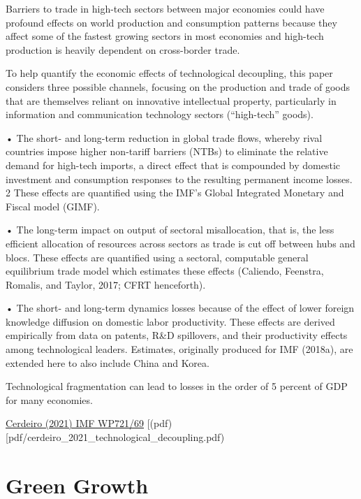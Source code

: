 \documentclass[
]{book}
\begin{document}
Barriers to trade in high-tech sectors
between major economies could have
profound effects on world production
and consumption patterns because they
affect some of the fastest growing
sectors in most economies and high-tech
production is heavily dependent on
cross-border trade.

To help quantify the economic effects of technological decoupling, this paper considers three
possible channels, focusing on the production and trade of goods that are themselves reliant on
innovative intellectual property, particularly in information and communication technology
sectors (``high-tech'' goods).

• The short- and long-term reduction in global trade flows, whereby rival countries impose
higher non-tariff barriers (NTBs) to eliminate the relative demand for high-tech imports,
a direct effect that is compounded by domestic investment and consumption responses to
the resulting permanent income losses. 2 These effects are quantified using the IMF's
Global Integrated Monetary and Fiscal model (GIMF).

• The long-term impact on output of sectoral misallocation, that is, the less efficient
allocation of resources across sectors as trade is cut off between hubs and blocs. These
effects are quantified using a sectoral, computable general equilibrium trade model which
estimates these effects (Caliendo, Feenstra, Romalis, and Taylor, 2017; CFRT
henceforth).

• The short- and long-term dynamics losses because of the effect of lower foreign
knowledge diffusion on domestic labor productivity. These effects are derived empirically
from data on patents, R\&D spillovers, and their productivity effects among technological
leaders. Estimates, originally produced for IMF (2018a), are extended here to also
include China and Korea.

Technological fragmentation can lead to losses in the order of 5 percent of GDP for many economies.

\href{https://www.imf.org/en/Publications/WP/Issues/2021/03/12/Sizing-Up-the-Effects-of-Technological-Decoupling-50125}{Cerdeiro (2021) IMF WP721/69}
{[}(pdf){[}pdf/cerdeiro\_2021\_technological\_decoupling.pdf)

\hypertarget{green-growth}{%
\chapter{Green Growth}\label{green-growth}}
\end{document}
